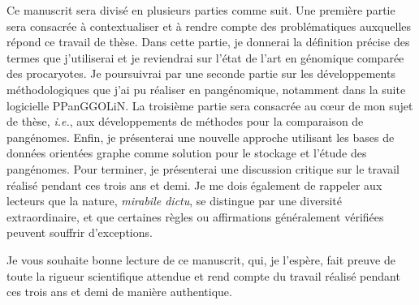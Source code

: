 \newpage

Ce manuscrit sera divisé en plusieurs parties comme suit. Une première partie sera consacrée à contextualiser et à rendre compte des problématiques auxquelles répond ce travail de thèse. Dans cette partie, je donnerai la définition précise des termes que j'utiliserai et je reviendrai sur l'état de l'art en génomique comparée des procaryotes. Je poursuivrai par une seconde partie sur les développements méthodologiques que j'ai pu réaliser en pangénomique, notamment dans la suite logicielle PPanGGOLiN. La troisième partie sera consacrée au c\oe ur de mon sujet de thèse, \textit{i.e.}, aux développements de méthodes pour la comparaison de pangénomes. Enfin, je présenterai une nouvelle approche utilisant les bases de données orientées graphe comme solution pour le stockage et l'étude des pangénomes. Pour terminer, je présenterai une discussion critique sur le travail réalisé pendant ces trois ans et demi. Je me dois également de rappeler aux lecteurs que la nature, \textit{mirabile dictu}, se distingue par une diversité extraordinaire, et que certaines règles ou affirmations généralement vérifiées peuvent souffrir d'exceptions.

\bigskip

Je vous souhaite bonne lecture de ce manuscrit, qui, je l'espère, fait preuve de toute la rigueur scientifique attendue et rend compte du travail réalisé pendant ces trois ans et demi de manière authentique.
